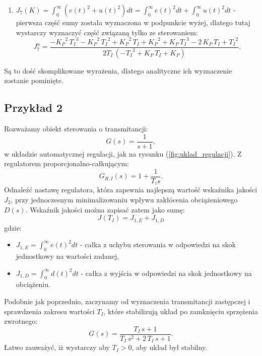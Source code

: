 \documentclass{article}
\begin{document}
\begin{enumerate}[(a)]
\begin{enumerate}[label=(\arabic*.)]
            \item $J_{7}(K) = \int_{0}^{\infty}{\left( e(t)^2 + u(t)^2 \right)dt} = \int_{0}^{\infty}{e(t)^2dt} + \int_{0}^{\infty}{u(t)^2dt}$ - pierwsza część sumy została wyznaczona w podpunkcie wyżej, dlatego tutaj wystarczy wyznaczyć część związaną tylko ze sterowaniem:
            $$
                J_{7}^{u} = \frac{-{K_{P}}^2\,{T_{I}}^3-{K_{P}}^2\,{T_{I}}^2+{K_{P}}^2\,T_{I}+{K_{P}}^2+K_{P}\,{T_{I}}^3-2\,K_{P}\,T_{I}+{T_{I}}^2}{2T_I\,\left(-{T_{I}}^2+K_{P}\,T_{I}+K_{P}\right)}.
            $$
        \end{enumerate}
        Są to dość skomplikowane wyrażenia, dlatego analityczne ich wyznaczenie zostanie pominięte.
    \end{enumerate} 
    
    \subsection{Przykład 2}
    Rozważamy obiekt sterowania o transmitancji:
    $$
        G(s) = \frac{1}{s + 1}, 
    $$
    w układzie automatycznej regulacji, jak na rysunku (\ref{fig:uklad_regulacji}).
    Z regulatorem proporcjonalno-całkującym:
    $$
        G_{R,I}(s) = 1 + \frac{1}{T_{i}s}.
    $$
    Odnaleźć nastawę regulatora, która zapewnia najlepszą wartość wskaźnika jakości $J_{2}$, przy jednoczesnym minimalizowaniu wpływu zakłócenia obciążeniowego $D(s)$.
    Wskaźnik jakości można zapisać zatem jako sumę:
    $$
        J(T_I) = J_{1,E} + J_{1,D}
    $$
    gdzie:
    \begin{itemize}
        \item $J_{1,E} = \int_{0}^{\infty}{e(t)^2dt}$ - całka z uchybu sterowania w odpowiedzi na skok jednostkowy na wartości zadanej,
        \item $J_{1,D} = \int_{0}^{\infty}{d(t)^2dt}$ - całka z wyjścia w odpowiedzi na skok jednostkowy na obciążeniu.
    \end{itemize}


    Podobnie jak poprzednio, zaczynamy od wyznaczenia transmitancji zastępczej i sprawdzenia zakresu wartości $T_{I}$, które stabilizują układ po zamknięciu sprzężenia zwrotnego:
    $$
        G(s)
        =
        \frac{T_{I}\,s+1}{T_{I}\,s^2+2\,T_{I}\,s+1}.
    $$
    Łatwo zauważyć, iż wystarczy aby $T_{I} > 0$, aby układ był stabilny.
\end{document}

